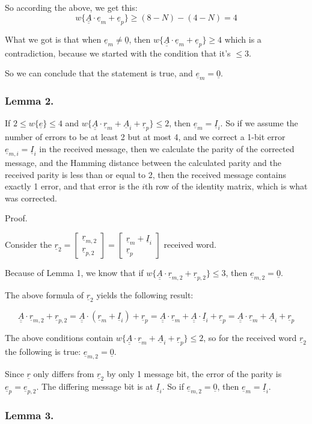 \documentclass[11pt,a4paper,oneside]{report}             %
\def\doubleunderline#1{\underline{\underline{#1}}}
\def\dul#1{\doubleunderline{#1}}
\def\ul#1{\underline{#1}}
\newcommand{\vect}[2]{\begin{bmatrix} #1 \\ #2 \end{bmatrix}}
\begin{document}
So according the above, we get this:
\[
    w\{ \dul{A} \cdot \ul{e}_m + \ul{e}_p \} \geq (8 - N) - (4 - N) = 4
\]

What we got is that when $\ul{e}_m \neq \ul{0}$, then
$w\{ \dul{A} \cdot \ul{e}_m + \ul{e}_p \} \geq 4$ which is a contradiction, because
we started with the condition that it's $\leq 3$.

So we can conclude that the statement is true, and $\ul{e}_m = \ul{0}$.

\subsubsection{Lemma 2.}

If $2 \leq w\{\ul{e}\} \leq 4$ and $w\{\dul{A} \cdot \ul{r}_m + \ul{A}_i + \ul{r}_p\} \leq 2$,
then $\ul{e}_m = \ul{I}_i$. So if we assume the number of errors to be at least 2 but at most 4,
and we correct a 1-bit error $\ul{e}_{m, i} = \ul{I}_i$ in the received message, then we calculate
the parity of the corrected message, and the Hamming distance between the calculated parity and
the received parity is less than or equal to 2, then the received message contains exactly 1 error,
and that error is the $i$th row of the identity matrix, which is what was corrected.

Proof.

Consider the $\ul{r}_2 = \vect{\ul{r}_{m,2}}{\ul{r}_{p,2}} = \vect{\ul{r}_m + \ul{I}_i}{\ul{r}_p}$ received word.

Because of Lemma 1, we know that
if $w\{ \dul{A} \cdot \ul{r}_{m,2} + \ul{r}_{p,2} \} \leq 3$, then $\ul{e}_{m,2} = \ul{0}$.

The above formula of $\ul{r}_2$ yields the following result:

\[
    \dul{A} \cdot \ul{r}_{m,2} + \ul{r}_{p,2} =
    \dul{A} \cdot ( \ul{r}_m + \ul{I}_i ) + \ul{r}_p =
    \dul{A} \cdot \ul{r}_m + \dul{A} \cdot \ul{I}_i + \ul{r}_p =
    \dul{A} \cdot \ul{r}_m + \ul{A}_i + \ul{r}_p
\]

The above conditions contain $w \{ \dul{A} \cdot \ul{r}_m + \ul{A}_i + \ul{r}_p \} \leq 2$,
so for the received word $\ul{r}_2$ the following is true: $\ul{e}_{m,2} = \ul{0}$.

Since $\ul{r}$ only differs from $\ul{r}_2$ by only 1 message bit, the error of the parity is
$\ul{e}_p = \ul{e}_{p,2}$. The differing message bit is at $\ul{I}_i$.
So if $\ul{e}_{m,2} = \ul{0}$, then $\ul{e}_m = \ul{I}_i$.

\subsubsection{Lemma 3.}
\end{document}
